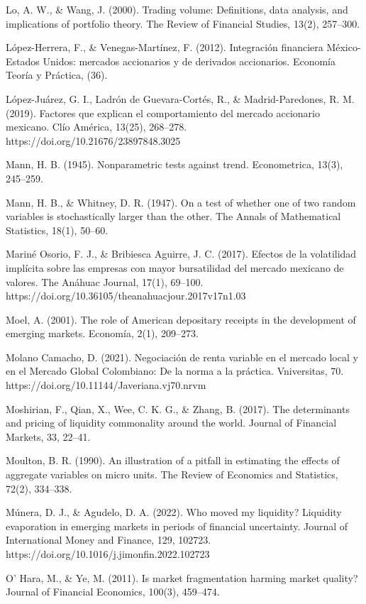 \begin{referencias}
Lo, A. W., \& Wang, J. (2000). Trading volume: Definitions, data analysis, and implications of portfolio theory. The Review of Financial Studies, 13(2), 257--300.

López-Herrera, F., \& Venegas-Martínez, F. (2012). Integración financiera México-Estados Unidos: mercados accionarios y de derivados accionarios. Economía Teoría y Práctica, (36).

López-Juárez, G. I., Ladrón de Guevara-Cortés, R., \& Madrid-Paredones, R. M. (2019). Factores que explican el comportamiento del mercado accionario mexicano. Clío América, 13(25), 268--278. https://doi.org/10.21676/23897848.3025

Mann, H. B. (1945). Nonparametric tests against trend. Econometrica, 13(3), 245--259.

Mann, H. B., \& Whitney, D. R. (1947). On a test of whether one of two random variables is stochastically larger than the other. The Annals of Mathematical Statistics, 18(1), 50--60.

Mariné Osorio, F. J., \& Bribiesca Aguirre, J. C. (2017). Efectos de la volatilidad implícita sobre las empresas con mayor bursatilidad del mercado mexicano de valores. The Anáhuac Journal, 17(1), 69--100. https://doi.org/10.36105/theanahuacjour.2017v17n1.03

Moel, A. (2001). The role of American depositary receipts in the development of emerging markets. Economía, 2(1), 209--273.

Molano Camacho, D. (2021). Negociación de renta variable en el mercado local y en el Mercado Global Colombiano: De la norma a la práctica. Vniversitas, 70. https://doi.org/10.11144/Javeriana.vj70.nrvm

Moshirian, F., Qian, X., Wee, C. K. G., \& Zhang, B. (2017). The determinants and pricing of liquidity commonality around the world. Journal of Financial Markets, 33, 22--41.

Moulton, B. R. (1990). An illustration of a pitfall in estimating the effects of aggregate variables on micro units. The Review of Economics and Statistics, 72(2), 334--338.

Múnera, D. J., \& Agudelo, D. A. (2022). Who moved my liquidity? Liquidity evaporation in emerging markets in periods of financial uncertainty. Journal of International Money and Finance, 129, 102723. https://doi.org/10.1016/j.jimonfin.2022.102723

O' Hara, M., \& Ye, M. (2011). Is market fragmentation harming market quality? Journal of Financial Economics, 100(3), 459--474.


\end{referencias}

